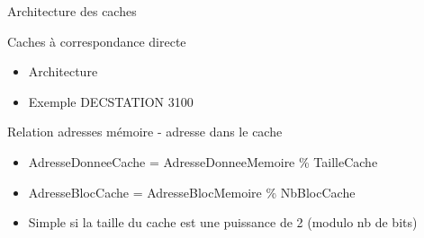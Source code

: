 %
\begin{Frame}{Architecture des caches}

      \begin{block}{Caches à correspondance directe}
       \begin{center}
 	\begin{itemize}
         \item Architecture
         \item Exemple DECSTATION 3100
        \end{itemize}
       \end{center}
      \end{block}   

  \begin{block}{Relation adresses mémoire - adresse dans le cache}
    \begin{center}
 	\begin{itemize}
        \item AdresseDonneeCache = AdresseDonneeMemoire \% TailleCache
	\item AdresseBlocCache = AdresseBlocMemoire \% NbBlocCache
	\item Simple si la taille du cache est une puissance de 2 (modulo nb de bits)
        \end{itemize}
    \end{center}
  \end{block}   

 

\end{Frame}


